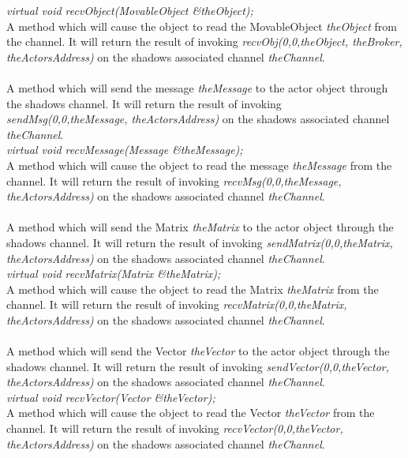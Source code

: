 {\em virtual void recvObject(MovableObject \&theObject);} \\
A method which will cause the object to read the MovableObject {\em
theObject} from the channel. It will return the
result of invoking {\em recvObj(0,0,theObject, theBroker, theActorsAddress)} on the
shadows associated channel {\em theChannel}. \\ 

\\
A method which will send the message {\em theMessage} to
the actor object through the shadows channel. It will return the
result of invoking {\em sendMsg(0,0,theMessage, theActorsAddress)} on the
shadows associated channel {\em theChannel}. \\ 


{\em virtual void recvMessage(Message \&theMessage);} \\
A method which will cause the object to read the message {\em
theMessage} from the channel. It will return the
result of invoking {\em recvMsg(0,0,theMessage, theActorsAddress)} on the
shadows associated channel {\em theChannel}. \\ 


\\
A method which will send the Matrix {\em theMatrix} to
the actor object through the shadows channel. It will return the
result of invoking {\em sendMatrix(0,0,theMatrix, theActorsAddress)} on the
shadows associated channel {\em theChannel}. \\ 


{\em virtual void recvMatrix(Matrix \&theMatrix);} \\
A method which will cause the object to read the Matrix {\em
theMatrix} from the channel. It will return the
result of invoking {\em recvMatrix(0,0,theMatrix, theActorsAddress)} on the
shadows associated channel {\em theChannel}. \\ 

\\
A method which will send the Vector {\em theVector} to
the actor object through the shadows channel. It will return the
result of invoking {\em sendVector(0,0,theVector, theActorsAddress)} on the
shadows associated channel {\em theChannel}. \\ 


{\em virtual void recvVector(Vector \&theVector);} \\
A method which will cause the object to read the Vector {\em
theVector} from the channel. It will return the
result of invoking {\em recvVector(0,0,theVector, theActorsAddress)} on the
shadows associated channel {\em theChannel}. \\ 


